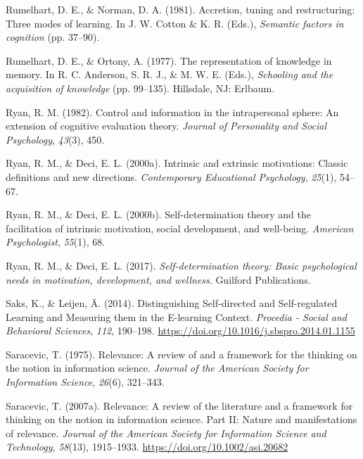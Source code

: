 \documentclass[letterpaper, nobind]{templates/ociamthesis}
\newlength{\cslhangindent}
\newenvironment{CSLReferences}[2] %
 {%
  \setlength{\parindent}{0pt}
  \ifodd #1
  \let\oldpar\par
  \def\par{\hangindent=\cslhangindent\oldpar}
  \fi
  \setlength{\parskip}{1mm}
  \setlength{\baselineskip}{6mm}
 }%
 {}
\begin{document}
\begin{CSLReferences}{1}{0}
\leavevmode{}%
Rumelhart, D. E., \& Norman, D. A. (1981). Accretion, tuning and restructuring: Three modes of learning. In J. W. Cotton \& K. R. (Eds.), \emph{Semantic factors in cognition} (pp. 37--90).

\leavevmode{}%
Rumelhart, D. E., \& Ortony, A. (1977). The representation of knowledge in memory. In R. C. Anderson, S. R. J., \& M. W. E. (Eds.), \emph{Schooling and the acquisition of knowledge} (pp. 99--135). Hillsdale, NJ: Erlbaum.

\leavevmode{}%
Ryan, R. M. (1982). Control and information in the intrapersonal sphere: An extension of cognitive evaluation theory. \emph{Journal of Personality and Social Psychology}, \emph{43}(3), 450.

\leavevmode{}%
Ryan, R. M., \& Deci, E. L. (2000a). Intrinsic and extrinsic motivations: Classic definitions and new directions. \emph{Contemporary Educational Psychology}, \emph{25}(1), 54--67.

\leavevmode{}%
Ryan, R. M., \& Deci, E. L. (2000b). Self-determination theory and the facilitation of intrinsic motivation, social development, and well-being. \emph{American Psychologist}, \emph{55}(1), 68.

\leavevmode{}%
Ryan, R. M., \& Deci, E. L. (2017). \emph{Self-determination theory: Basic psychological needs in motivation, development, and wellness}. Guilford Publications.

\leavevmode{}%
Saks, K., \& Leijen, Ä. (2014). Distinguishing {Self}-directed and {Self}-regulated {Learning} and {Measuring} them in the {E}-learning {Context}. \emph{Procedia - Social and Behavioral Sciences}, \emph{112}, 190--198. \url{https://doi.org/10.1016/j.sbspro.2014.01.1155}

\leavevmode{}%
Saracevic, T. (1975). Relevance: A review of and a framework for the thinking on the notion in information science. \emph{Journal of the American Society for Information Science}, \emph{26}(6), 321--343.

\leavevmode{}%
Saracevic, T. (2007a). Relevance: A review of the literature and a framework for thinking on the notion in information science. {Part II}: Nature and manifestations of relevance. \emph{Journal of the American Society for Information Science and Technology}, \emph{58}(13), 1915--1933. \url{https://doi.org/10.1002/asi.20682}


\end{CSLReferences}
\end{document}
